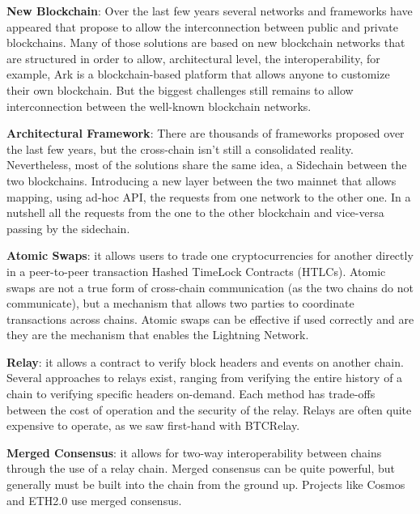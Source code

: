 \begin{outline}
    \1 \textbf{New Blockchain}: Over the last few years several networks and frameworks have appeared that propose to 
    allow the interconnection between public and private blockchains. Many of those solutions are based on new 
    blockchain networks that are structured in order to allow, architectural level, the interoperability, for 
    example, Ark\cite{ark} is a blockchain-based platform that allows anyone to customize their own blockchain. But 
    the biggest challenges still remains to allow interconnection between the well-known blockchain 
    networks. 

    \1 \textbf{Architectural Framework}: There are thousands of frameworks proposed over the last few years, but 
    the cross-chain isn't still a consolidated reality. Nevertheless, most of the solutions share the same idea, a 
    Sidechain\cite{sidechain} between the two blockchains. Introducing a new layer between the two mainnet that allows 
    mapping, using ad-hoc API, the requests from one network to the other one. In a nutshell all the requests 
    from the one to the other blockchain and vice-versa passing by the sidechain.\cite{atomic-crosschain} \cite{iot-crosschain}

    \1 \textbf{Atomic Swaps}\cite{atomic-swap}: it allows users to trade one cryptocurrencies for another directly in a peer-to-peer 
    transaction Hashed TimeLock Contracts (HTLCs)\cite{HTLC}. Atomic swaps are not a true form of cross-chain 
    communication (as the two chains do not communicate), but a mechanism that allows two parties to 
    coordinate transactions across chains. Atomic swaps can be effective if used correctly and are they are the 
    mechanism that enables the Lightning Network\cite{lightning}.

    \1 \textbf{Relay}: it allows a contract to verify block headers and events on another chain. Several 
    approaches to relays exist, ranging from verifying the entire history of a chain to verifying specific 
    headers on-demand. Each method has trade-offs between the cost of operation and the security of the relay. 
    Relays are often quite expensive to operate, as we saw first-hand with BTCRelay\cite{relay}.

    \1 \textbf{Merged Consensus}: it allows for two-way interoperability between chains through the use of a relay 
    chain. Merged consensus can be quite powerful, but generally must be built into the chain from the ground 
    up. Projects like Cosmos\cite{cosmos} and ETH2.0\cite{eth2} 
    use merged consensus.


\end{outline}
